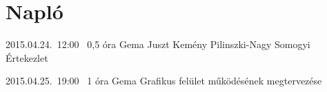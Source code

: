 %
\section{Napló}

\begin{naplo}

\bejegyzes
{2015.04.24.~12:00~} %
{0,5 óra} %
{Gema\newline
Juszt\newline
Kemény\newline
Pilinszki-Nagy\newline
Somogyi} %
{Értekezlet} %

\bejegyzes
{2015.04.25.~19:00~}
{1 óra}
{Gema}
{Grafikus felület működésének megtervezése}



\end{naplo}

